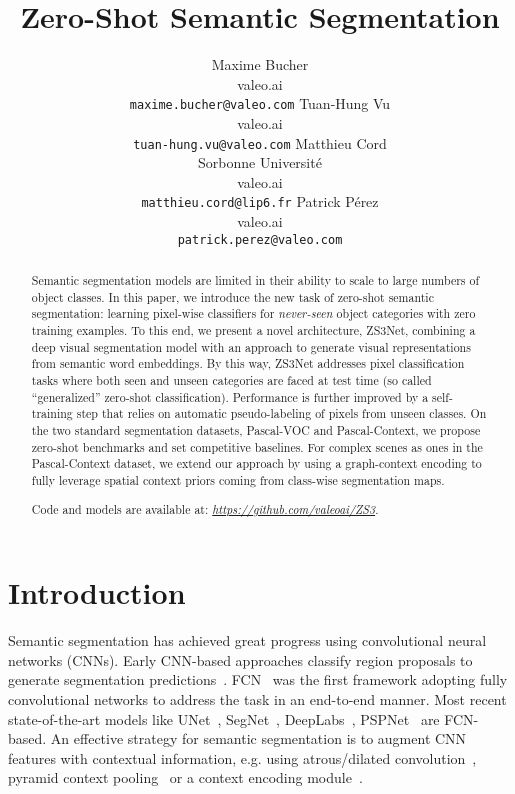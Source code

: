\documentclass{article}
\title{Zero-Shot Semantic Segmentation}
\author{
   Maxime Bucher \\
   valeo.ai  \\
   \texttt{maxime.bucher@valeo.com} 
   \And
   Tuan-Hung Vu \\
   valeo.ai  \\
   \texttt{tuan-hung.vu@valeo.com} 
   \AND
   Matthieu Cord \\
   Sorbonne Université\\valeo.ai  \\
   \texttt{matthieu.cord@lip6.fr} 
   \And
   Patrick Pérez \\
   valeo.ai  \\
   \texttt{patrick.perez@valeo.com} 
}
\begin{document}
\maketitle

\begin{abstract}
    Semantic segmentation models are limited in their ability to scale to large numbers of object classes. In this paper, we introduce the new task of zero-shot semantic segmentation: learning pixel-wise classifiers for \emph{never-seen} object categories with zero training examples. To this end, we present a novel architecture, ZS3Net, combining a deep visual  segmentation model with an approach to generate visual representations from semantic word embeddings. By this way, ZS3Net addresses pixel classification tasks where both seen and unseen categories are faced at test time (so called ``generalized'' zero-shot classification). Performance is further improved by a self-training step that relies on automatic pseudo-labeling of pixels from unseen classes. On the two standard segmentation datasets, Pascal-VOC and Pascal-Context, we propose zero-shot benchmarks and set competitive baselines. For complex scenes as ones in the Pascal-Context dataset, we extend our approach by using a graph-context encoding to fully leverage spatial context priors coming from class-wise segmentation maps.
    
    Code and models are available at: \textit{\textcolor{blue}{\url{https://github.com/valeoai/ZS3}}}.
\end{abstract} 
\section{Introduction}

Semantic segmentation has achieved great progress using convolutional neural networks (CNNs).
Early CNN-based approaches classify region proposals to generate segmentation predictions~\cite{girshick2014rich}.
FCN~\cite{long2015fully} was the first framework adopting fully convolutional networks to address the task in an end-to-end manner.
Most recent state-of-the-art models like UNet~\cite{ronneberger2015u}, SegNet~\cite{badrinarayanan2017segnet}, DeepLabs~\cite{chen2017deeplab, chen2018encoder}, PSPNet~\cite{zhao2017pyramid} are FCN-based.
An effective strategy for semantic segmentation is to augment CNN features with contextual information, e.g. using atrous/dilated convolution~\cite{chen2017deeplab,yu2015multi}, pyramid context pooling~\cite{zhao2017pyramid} or a context encoding module~\cite{zhang2018context}.
\end{document}
